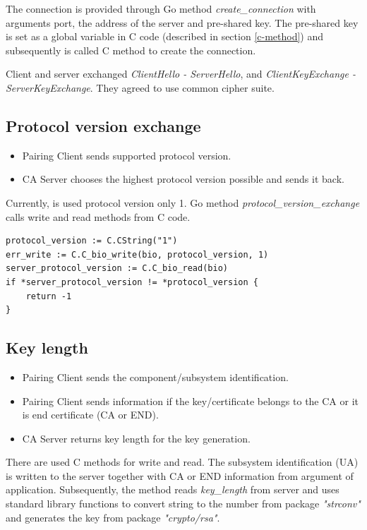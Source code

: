 \documentclass[
  digital, %
  notable,   %
  lof,     %
  lot,     %
]{fithesis3}
\begin{document}
The connection is provided through Go method \textit{create\_connection} with arguments port, the 
address of the server and pre-shared key. The pre-shared key is set as a global variable in C code 
(described in section \ref{c-method}) and subsequently is called C method to create the connection. 

Client and server exchanged \textit{ClientHello - ServerHello}, and \textit{ClientKeyExchange - 
ServerKeyExchange}. They agreed to use common cipher suite. 

\subsection{Protocol version exchange}
\begin{itemize}[leftmargin=2em,rightmargin=1em,itemsep=0.75\parskip,parsep=0em,topsep=0em,partopsep=0em]
\item Pairing Client sends supported protocol version.
\item CA Server chooses the highest protocol version possible and sends it back.
\end{itemize}

Currently, is used protocol version only 1. Go method \textit{protocol\_version\_exchange} calls 
write and read methods from C code.

\begin{lstlisting}
protocol_version := C.CString("1")
err_write := C.C_bio_write(bio, protocol_version, 1)
server_protocol_version := C.C_bio_read(bio)
if *server_protocol_version != *protocol_version {
	return -1
} 
\end{lstlisting}


\subsection{Key length}
\begin{itemize}[leftmargin=2em,rightmargin=1em,itemsep=0.75\parskip,parsep=0em,topsep=0em,partopsep=0em]
\item Pairing Client sends the component/subsystem identification.
\item Pairing Client sends information if the key/certificate belongs to the CA or it is end certificate (CA or END).
\item CA Server returns key length for the key generation.
\end{itemize}
    
There are used C methods for write and read. The subsystem identification (UA) is written to the server together with CA or END information from argument of application. Subsequently, the method reads \textit{key\_length} from server and uses standard library functions to convert string to the number from package \textit{"strconv"} and generates the key from package \textit{"crypto/rsa"}.
\end{document}
